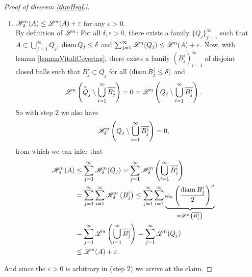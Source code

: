 \begin{proof}[Proof of theorem \ref{thmHeqL}]
\begin{enumerate}
\item $\mathscr{H}^{n}_\delta(A) \leq \mathscr{L}^{n}(A) + \varepsilon$ for any $\varepsilon >
0$.
\\
By definition of $\mathscr{L}^{n}$: For all $\delta, \varepsilon > 0$, 
there exists a family $\{Q_j\}_{j=1}^\infty$ such that $A \subset
\bigcup_{j=1}^\infty Q_j$, $\operatorname{diam} Q_j \leq \delta$ 
and $\sum_{j=1}^\infty \mathscr{L}^{n}(Q_j) \leq \mathscr{L}^{n}(A) + \varepsilon$.
Now, with lemma \ref{lemmaVitaliCovering}, there exists a family
$(B_j^i)_{i=1}^\infty$ of disjoint
closed balls such that $B_j^i \subset Q_j$ for all $(\operatorname{diam} B^i_j \leq
\delta)$ and 
\vspace{-0.4em}
\[
\mathscr{L}^{n}\left(\overset{\circ}{Q}_j \setminus \bigcup_{i=1}^\infty
\overline{B_j^i}\right) 
= 0 
= \mathscr{L}^{n}\left(Q_j \setminus \bigcup_{i=1}^\infty
\overline{B_j^i}\right).
\]
So with step 2 we also have
\vspace{-0.4em}
\[
\mathscr{H}^{n}_\delta\left(Q_j \setminus \bigcup_{i=1}^\infty
\overline{B_j^i}\right) = 0,
\]
from which we can infer that
\[
\begin{aligned}
\Haus{n}_\delta(A) 
&\leq \sum_{j=1}^\infty \Haus{n}_\delta(Q_j) 
= \sum_{j=1}^\infty \Haus{n}_\delta \left(\bigcup_{i=1}^\infty
\overline{B_j^i}\right)
\\&= \sum_{j=1}^\infty  \sum_{i=1}^\infty
\Haus{n}_\delta \left( B_j^i\right)
\leq \sum_{j=1}^\infty  \sum_{i=1}^\infty
\underbrace{
\omega_n\left(\frac{\diam
B^i_j}{2}\right)^n}%
_{=\Leb{n}\left(\overline{B^i_j}\right)}
\\&= 
\sum_{j=1}^\infty  
\Leb{n}\left(\bigcup_{i=1}^\infty\overline{B^i_j}\right)
= 
\sum_{j=1}^\infty  
\Leb{n}(Q_j)
\\ &\leq \Leb{n}(A) + \varepsilon.
\end{aligned}
\]
\end{enumerate}
And since the $\varepsilon > 0$ is arbitrary in (step 2) we arrive at the claim.
\end{proof}

